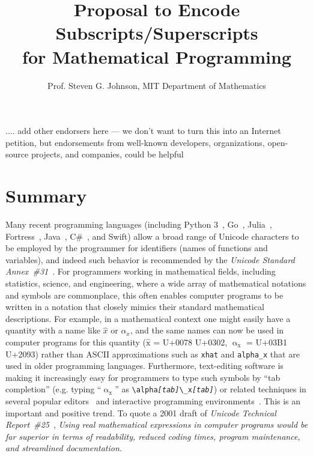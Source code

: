 \documentclass[10pt,english]{article}
\begin{document}
\title{Proposal to Encode Subscripts/Superscripts\\
for Mathematical Programming}


\author{Prof. Steven G. Johnson, MIT Department of Mathematics }

\maketitle
\begin{center}
.... add other endorsers here --- we don't want to turn this into
an Internet petition, but endorsements from well-known developers,
organizations, open-source projects, and companies, could be helpful
\par\end{center}


\section{Summary}

Many recent programming languages (including Python 3~\cite{Python},
Go~\cite{Go}, Julia~\cite{Julia}, Fortress~\cite{Fortress},
Java~\cite{Java}, C\#~\cite{Csharp}, and Swift\cite{Swift}) allow
a broad range of Unicode characters to be employed by the programmer
for identifiers (names of functions and variables), and indeed such
behavior is recommended by the \emph{Unicode Standard Annex~\#31}~\cite{UAX31}.
For programmers working in mathematical fields, including statistics,
science, and engineering, where a wide array of mathematical notations
and symbols are commonplace, this often enables computer programs
to be written in a notation that closely mimics their standard mathematical
descriptions. For example, in a mathematical context one might easily
have a quantity with a name like $\hat{x}$ or $\alpha_{x}$, and
the same names can now be used in computer programs for this quantity
($\mathrm{\hat{{x}}}$ = U+0078 U+0302, $\mathrm{{\upalpha_{x}}}$
= U+03B1 U+2093) rather than ASCII approximations such as \texttt{xhat}
and \texttt{alpha\_x} that are used in older programming languages.
Furthermore, text-editing software is making it increasingly easy
for programmers to type such symbols by ``tab completion''
(e.g. typing ``$\mathrm{{\upalpha_{x}}}$''
as \texttt{\textbackslash{}alpha}\texttt{\emph{{[}tab{]}}}\texttt{\textbackslash{}\_x}\texttt{\emph{{[}tab{]}}})
or related techniques in several popular editors~\cite{Atom,Emacs,Sublime,Vim}
and interactive programming environments~\cite{Julia,IPython}. This
is an important and positive trend. To quote a 2001 draft of \emph{Unicode
Technical Report~\#25}~\cite[section 5.3]{UTR25}, \emph{Using real
mathematical expressions in computer programs would be far superior
in terms of readability, reduced coding times, program maintenance,
and streamlined documentation.}
\end{document}
